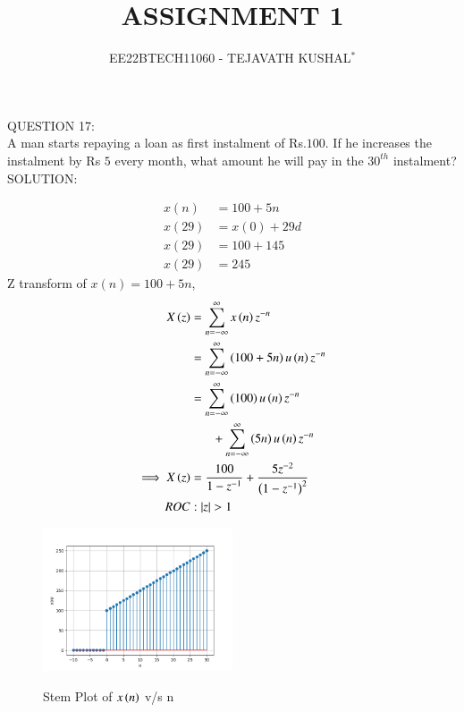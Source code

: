 \documentclass[journal,12pt,twocolumn]{IEEEtran}
\theoremstyle{remark}
\begin{document}

\vspace{3cm}

\title{ASSIGNMENT 1}
\author{EE22BTECH11060 - TEJAVATH KUSHAL$^{*}$%
}
\maketitle
\newpage
\bigskip

\renewcommand{\thefigure}{\theenumi}
\renewcommand{\thetable}{\theenumi}


\maketitle
QUESTION 17:\\
A man starts repaying a loan as first instalment of Rs.$100$. If he increases the
instalment by Rs $5$ every month, what amount he will pay in the $30^{th}$ instalment?\\

SOLUTION:\\
\begin{table}[ht]

\end{table}

\begin{align}
x(n)&= 100 + 5n \\
x(29)&= x(0)+29d \\
x(29)&= 100+ 145 \\
x(29)&= 245
\label{tab:table1}
\end{align}
Z transform of $x(n)= 100 + 5n$,
\begin{align}
X \left(z\right) & = \sum_{n=-\infty}^{\infty} x \left(n\right)   z^{-n} \\
& = \sum_{n=-\infty}^{\infty}  \left(100+5n\right) u \left(n\right)   z^{-n} \\
\notag & = \sum_{n=-\infty}^{\infty} \left(100\right) u \left(n\right)   z^{-n} \\  &~~~~~~~+\sum_{n=-\infty}^{\infty} \left(5n\right) u \left(n\right)  z^{-n} \\
\implies X \left(z\right) & = \frac{100}{1-z^{-1}} + \frac{5z^{-2}}{\left(1-z^{-1}\right)^2} \\
ROC &: \left\vert z\right\vert > 1 \notag
\end{align}


\pagebreak

\begin{figure}[h]
    \includegraphics[width=0.5\textwidth]{figs/x(n)_vs_n.png}\label{fig:stem-plot}
    \caption{Stem Plot of $x\left(n\right)$ v/s n}
\end{figure}
\end{document}
